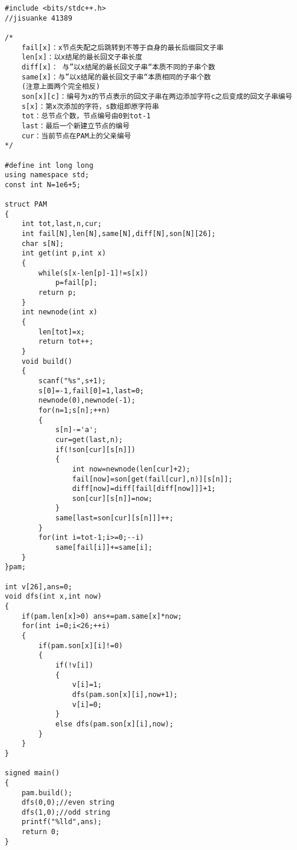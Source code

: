 \begin{lstlisting}
#include <bits/stdc++.h>
//jisuanke 41389

/*
	fail[x]：x节点失配之后跳转到不等于自身的最长后缀回文子串
	len[x]：以x结尾的最长回文子串长度
	diff[x]： 与”以x结尾的最长回文子串“本质不同的子串个数
	same[x]：与”以x结尾的最长回文子串“本质相同的子串个数
	(注意上面两个完全相反)
	son[x][c]：编号为x的节点表示的回文子串在两边添加字符c之后变成的回文子串编号
	s[x]：第x次添加的字符，s数组即原字符串
	tot：总节点个数，节点编号由0到tot-1
	last：最后一个新建立节点的编号
	cur：当前节点在PAM上的父亲编号
*/

#define int long long
using namespace std;
const int N=1e6+5;

struct PAM
{
	int tot,last,n,cur;
	int fail[N],len[N],same[N],diff[N],son[N][26];
	char s[N];
	int get(int p,int x)
	{
		while(s[x-len[p]-1]!=s[x])
			p=fail[p];
		return p;
	}
	int newnode(int x)
	{
		len[tot]=x;
		return tot++;
	}
	void build()
	{
		scanf("%s",s+1);
		s[0]=-1,fail[0]=1,last=0;
		newnode(0),newnode(-1);
		for(n=1;s[n];++n)
		{
			s[n]-='a';
			cur=get(last,n);
			if(!son[cur][s[n]])
			{
				int now=newnode(len[cur]+2);
				fail[now]=son[get(fail[cur],n)][s[n]];
				diff[now]=diff[fail[diff[now]]]+1;
				son[cur][s[n]]=now;
			}
			same[last=son[cur][s[n]]]++;
		}
		for(int i=tot-1;i>=0;--i)
			same[fail[i]]+=same[i];
	}
}pam;

int v[26],ans=0;
void dfs(int x,int now)
{
	if(pam.len[x]>0) ans+=pam.same[x]*now;
	for(int i=0;i<26;++i)
	{
		if(pam.son[x][i]!=0)
		{
			if(!v[i])
			{
				v[i]=1;
				dfs(pam.son[x][i],now+1);
				v[i]=0;
			}
			else dfs(pam.son[x][i],now);
		}
	}
}

signed main()
{
	pam.build();
	dfs(0,0);//even string
	dfs(1,0);//odd string
	printf("%lld",ans);
	return 0;
}
\end{lstlisting}